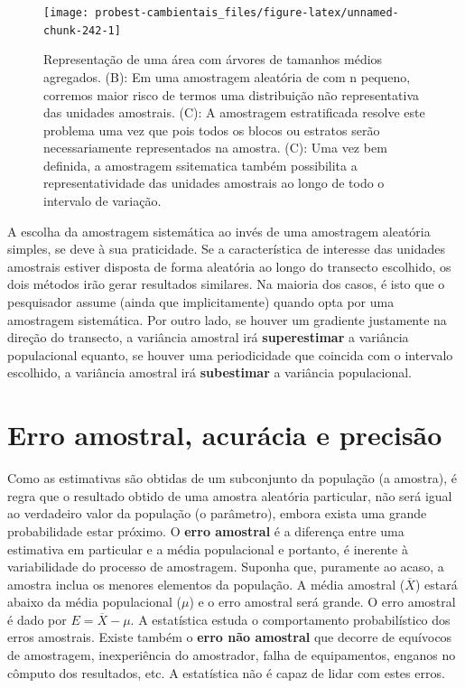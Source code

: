 \documentclass[
]{book}
\begin{document}
\begin{figure}

{\centering \texttt{[image: probest-cambientais\_files/figure-latex/unnamed-chunk-242-1]} 

}

\caption{Representação de uma área com árvores de tamanhos médios agregados. (B): Em uma amostragem aleatória de com n pequeno, corremos maior risco de termos uma distribuição não representativa das unidades amostrais. (C): A amostragem estratificada resolve este problema uma vez que pois todos os blocos ou estratos serão necessariamente representados na amostra. (C): Uma vez bem definida, a amostragem ssitematica também possibilita a representatividade das unidades amostrais ao longo de todo o intervalo de variação.}\label{fig:unnamed-chunk-242}
\end{figure}

A escolha da amostragem sistemática ao invés de uma amostragem aleatória simples, se deve à sua praticidade. Se a característica de interesse das unidades amostrais estiver disposta de forma aleatória ao longo do transecto escolhido, os dois métodos irão gerar resultados similares. Na maioria dos casos, é isto que o pesquisador assume (ainda que implicitamente) quando opta por uma amostragem sistemática. Por outro lado, se houver um gradiente justamente na direção do transecto, a variância amostral irá \textbf{superestimar} a variância populacional equanto, se houver uma periodicidade que coincida com o intervalo escolhido, a variância amostral irá \textbf{subestimar} a variância populacional.

\hypertarget{erro-amostral-acuruxe1cia-e-precisuxe3o}{%
\section{Erro amostral, acurácia e precisão}\label{erro-amostral-acuruxe1cia-e-precisuxe3o}}

Como as estimativas são obtidas de um subconjunto da população (a amostra), é regra que o resultado obtido de uma amostra aleatória particular, não será igual ao verdadeiro valor da população (o parâmetro), embora exista uma grande probabilidade estar próximo. O \textbf{erro amostral} é a diferença entre uma estimativa em particular e a média populacional e portanto, é inerente à variabilidade do processo de amostragem. Suponha que, puramente ao acaso, a amostra inclua os menores elementos da população. A média amostral (\(\overline{X}\)) estará abaixo da média populacional (\(\mu\)) e o erro amostral será grande. O erro amostral é dado por \(E = \overline{X} - \mu\). A estatística estuda o comportamento probabilístico dos erros amostrais. Existe também o \textbf{erro não amostral} que decorre de equívocos de amostragem, inexperiência do amostrador, falha de equipamentos, enganos no cômputo dos resultados, etc. A estatística não é capaz de lidar com estes erros.
\end{document}
